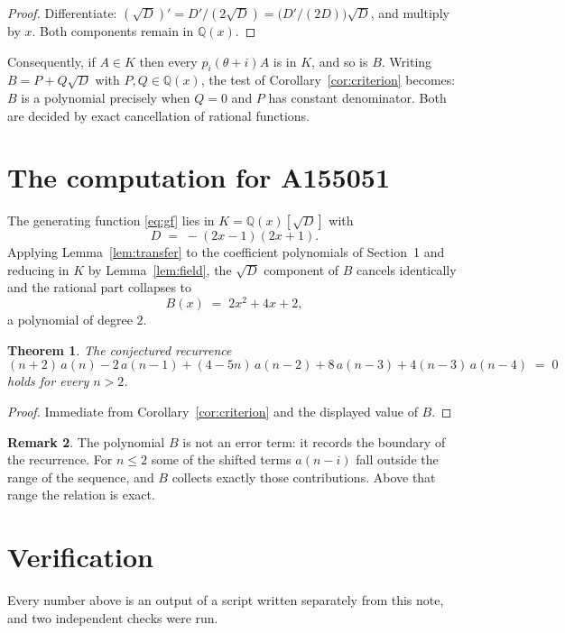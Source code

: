 \documentclass[11pt,a4paper]{article}
\theoremstyle{plain}
\newtheorem{theorem}{Theorem}
\theoremstyle{definition}
\newtheorem{remark}[theorem]{Remark}
\begin{document}
\begin{proof}
Differentiate: $(\sqrt{D})'=D'/(2\sqrt{D})=\bigl(D'/(2D)\bigr)\sqrt{D}$, and multiply by
$x$. Both components remain in $\mathbb{Q}(x)$.
\end{proof}

Consequently, if $A\in K$ then every $p_{i}(\theta+i)A$ is in $K$, and so is $B$. Writing
$B=P+Q\sqrt{D}$ with $P,Q\in\mathbb{Q}(x)$, the test of Corollary~\ref{cor:criterion}
becomes: $B$ is a polynomial precisely when $Q=0$ and $P$ has constant denominator. Both
are decided by exact cancellation of rational functions.

\section{The computation for A155051}

The generating function \eqref{eq:gf} lies in $K=\mathbb{Q}(x)[\sqrt{D}]$ with
\[
D \;=\; - \left(2 x - 1\right) \left(2 x + 1\right) .
\]
Applying Lemma~\ref{lem:transfer} to the coefficient polynomials of Section~1 and reducing
in $K$ by Lemma~\ref{lem:field}, the $\sqrt{D}$ component of $B$ cancels identically and
the rational part collapses to
\[
B(x)\;=\;2 x^{2} + 4 x + 2 ,
\]
a polynomial of degree $2$.

\begin{theorem}
The conjectured recurrence
\[
(n + 2)\,a(n) - 2\,a(n-1) + (4 - 5 n)\,a(n-2) + 8\,a(n-3) + 4 \left(n - 3\right)\,a(n-4) \;=\;0
\]
holds for every $n>2$.
\end{theorem}

\begin{proof}
Immediate from Corollary~\ref{cor:criterion} and the displayed value of $B$.
\end{proof}

\begin{remark}
The polynomial $B$ is not an error term: it records the boundary of the recurrence. For
$n\le2$ some of the shifted terms $a(n-i)$ fall outside the range of the sequence,
and $B$ collects exactly those contributions. Above that range the relation is exact.
\end{remark}

\section{Verification}

Every number above is an output of a script written separately from this note, and two
independent checks were run.
\end{document}
